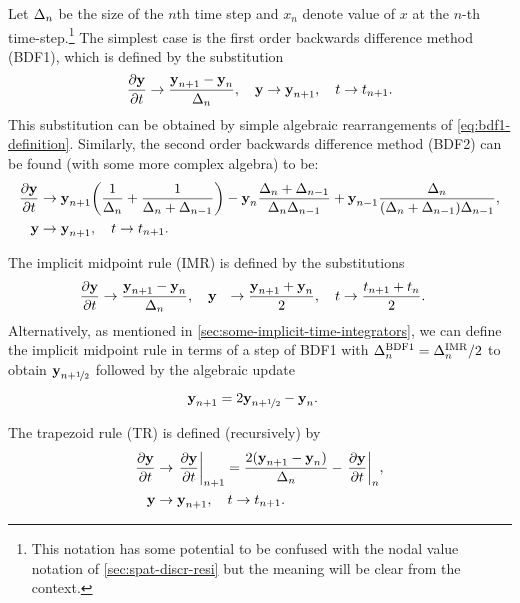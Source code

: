 {Let $\Delta_{n}$ be the size of the $n$th time step and $x_n$ denote value of $x$ at the $n$-th time-step.\footnote{This notation has some potential to be confused with the nodal value notation of \cref{sec:spat-discr-resi} but the meaning will be clear from the context.}
The simplest case is the first order backwards difference method (BDF1), which is defined by the substitution
\begin{equation}
    \frac{\partial \boldsymbol{\mathrm{y}}}{\partial t} \rightarrow \frac{\boldsymbol{\mathrm{y}}_{n+1} - \boldsymbol{\mathrm{y}}_n}{\Delta_{n}}, \quad
    \boldsymbol{\mathrm{y}} \rightarrow \boldsymbol{\mathrm{y}}_{n+1}, \quad t \rightarrow t_{n+1}.
    \label{eq:impl-bdf1}
\end{equation}
This substitution can be obtained by simple algebraic rearrangements of \cref{eq:bdf1-definition}.
Similarly, the second order backwards difference method (BDF2) can be found (with some more complex algebra) to be:
\begin{equation}
  \begin{aligned}
    \frac{\partial \boldsymbol{\mathrm{y}}}{\partial t} &\rightarrow \boldsymbol{\mathrm{y}}_{n+1}{\left( \frac{1}{\Delta_{n}} + \frac{1}{\Delta_{n} + \Delta_{n-1}} \right)}
    - \boldsymbol{\mathrm{y}}_n \frac{\Delta_{n} + \Delta_{n-1}}{\Delta_{n}\Delta_{n-1}}
    + \boldsymbol{\mathrm{y}}_{n-1} \frac{\Delta_{n}}{(\Delta_{n} + \Delta_{n-1})\Delta_{n-1}}, \\
    \boldsymbol{\mathrm{y}} &\rightarrow \boldsymbol{\mathrm{y}}_{n+1}, \quad t \rightarrow t_{n+1}.
    \label{eq:impl-bdf2}
  \end{aligned}
\end{equation}

The implicit midpoint rule (IMR) is defined by the substitutions
\begin{equation}
  \begin{aligned}
    \frac{\partial \boldsymbol{\mathrm{y}}}{\partial t} &\rightarrow \frac{\boldsymbol{\mathrm{y}}_{n+1} - \boldsymbol{\mathrm{y}}_n}{\Delta_{n}}, \quad
    \boldsymbol{\mathrm{y}} &\rightarrow \frac{\boldsymbol{\mathrm{y}}_{n+1} + \boldsymbol{\mathrm{y}}_n}{2}, \quad
    t &\rightarrow \frac{t_{n+1} + t_n}{2}.
    \label{eq:impl-imr}
  \end{aligned}
\end{equation}
Alternatively, as mentioned in \cref{sec:some-implicit-time-integrators}, we can define the implicit midpoint rule in terms of a step of BDF1 with $\Delta_{n}^{\mathrm{BDF1}} = \Delta_{n}^{\mathrm{IMR}}/2$ to obtain $\boldsymbol{\mathrm{y}}_{n+\nicefrac{1}{2}}$ followed by the algebraic update
\begin{equation}
  \begin{aligned}
    \label{eq:imr-bdf1}
    \boldsymbol{\mathrm{y}}_{n+1} &= 2\boldsymbol{\mathrm{y}}_{n+\nicefrac{1}{2}} - \boldsymbol{\mathrm{y}}_n.
  \end{aligned}
\end{equation}

The trapezoid rule (TR) is defined (recursively) by
\begin{equation}
  \begin{aligned}
    \frac{\partial \boldsymbol{\mathrm{y}}}{\partial t} &\rightarrow {\left. {\frac{\partial \boldsymbol{\mathrm{y}}}{\partial t}} \right|_{n+1}}
    = \frac{2(\boldsymbol{\mathrm{y}}_{n+1} - \boldsymbol{\mathrm{y}}_n)}{\Delta_{n}} - {\left. {\frac{\partial \boldsymbol{\mathrm{y}}}{\partial t}} \right|_{n}}, \\
    \boldsymbol{\mathrm{y}} &\rightarrow \boldsymbol{\mathrm{y}}_{n+1}, \quad t \rightarrow t_{n+1}.
    \label{eq:impl-tr}
  \end{aligned}
\end{equation}

}
